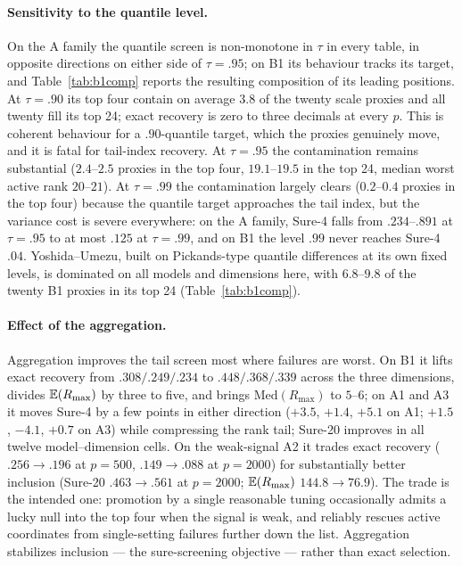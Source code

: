 \paragraph{Sensitivity to the quantile level.}
On the A family the quantile screen is non-monotone in $\tau$ in every
table, in opposite directions on either side of $\tau=.95$; on B1 its
behaviour tracks its target, and Table~\ref{tab:b1comp} reports the
resulting composition of its leading positions. At $\tau=.90$ its top
four contain on average $3.8$ of the twenty scale proxies and all
twenty fill its top 24; exact recovery is zero to three decimals at
every $p$. This is coherent behaviour for a $.90$-quantile target,
which the proxies genuinely move, and it is fatal for tail-index
recovery. At $\tau=.95$ the contamination remains substantial
($2.4$--$2.5$ proxies in the top four, $19.1$--$19.5$ in the top 24,
median worst active rank $20$--$21$). At $\tau=.99$ the contamination
largely clears ($0.2$--$0.4$ proxies in the top four) because the
quantile target approaches the tail index, but the variance cost is
severe everywhere: on the A family, Sure-4 falls from $.234$--$.891$
at $\tau=.95$ to at most $.125$ at $\tau=.99$, and on B1 the level
$.99$ never reaches Sure-4 $.04$. Yoshida--Umezu, built on
Pickands-type quantile differences at its own fixed levels, is
dominated on all models and dimensions here, with $6.8$--$9.8$ of the
twenty B1 proxies in its top 24 (Table~\ref{tab:b1comp}).

\paragraph{Effect of the aggregation.}
Aggregation improves the tail screen most where failures are worst. On
B1 it lifts exact recovery from $.308/.249/.234$ to $.448/.368/.339$
across the three dimensions, divides $\mathbb E(R_{\max})$ by three to five,
and brings $\mathrm{Med}(R_{\max})$ to $5$--$6$; on A1 and A3 it moves
Sure-4 by a few points in either direction ($+3.5$, $+1.4$, $+5.1$ on
A1; $+1.5$, $-4.1$, $+0.7$ on A3) while compressing the
rank tail; Sure-20 improves in all twelve model--dimension cells. On the weak-signal A2 it
trades exact recovery ($.256\to.196$ at $p=500$,
$.149\to.088$ at $p=2000$) for substantially better inclusion
(Sure-20 $.463\to.561$ at $p=2000$; $\mathbb E(R_{\max})$ $144.8\to76.9$).
The trade is the intended one: promotion by a single reasonable tuning
occasionally admits a lucky null into the top four when the signal is
weak, and reliably rescues active coordinates from single-setting
failures further down the list. Aggregation stabilizes inclusion ---
the sure-screening objective --- rather than exact selection.

